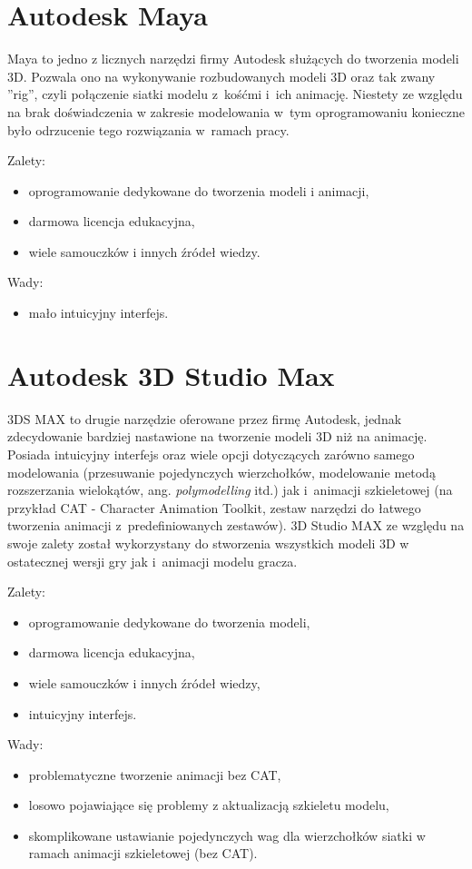 \section{Autodesk Maya}

Maya to jedno z licznych narzędzi firmy Autodesk służących do tworzenia modeli 3D. Pozwala ono na wykonywanie rozbudowanych modeli 3D oraz tak zwany ''rig'', czyli połączenie siatki modelu z~kośćmi i~ich animację. Niestety ze względu na brak doświadczenia w zakresie modelowania w~tym oprogramowaniu konieczne było odrzucenie tego rozwiązania w~ramach pracy.

{\raggedright Zalety:
\begin{itemize}
\item oprogramowanie dedykowane do tworzenia modeli i animacji,
\item darmowa licencja edukacyjna,
\item wiele samouczków i innych źródeł wiedzy.
\end{itemize}

Wady:
\begin{itemize}
\item mało intuicyjny interfejs.
\end{itemize}
}

\section{Autodesk 3D Studio Max}

3DS MAX to drugie narzędzie oferowane przez firmę Autodesk, jednak zdecydowanie bardziej nastawione na tworzenie modeli 3D niż na animację. Posiada intuicyjny interfejs oraz wiele opcji dotyczących zarówno samego modelowania (przesuwanie pojedynczych wierzchołków, modelowanie metodą rozszerzania wielokątów, ang. \emph{polymodelling} itd.) jak i~animacji szkieletowej (na przykład CAT - Character Animation Toolkit, zestaw narzędzi do łatwego tworzenia animacji z~predefiniowanych zestawów). 3D Studio MAX ze względu na swoje zalety został wykorzystany do stworzenia wszystkich modeli 3D w ostatecznej wersji gry jak i~animacji modelu gracza.

{\raggedright Zalety:
\begin{itemize}
\item oprogramowanie dedykowane do tworzenia modeli,
\item darmowa licencja edukacyjna,
\item wiele samouczków i innych źródeł wiedzy,
\item intuicyjny interfejs.
\end{itemize}

Wady:
\begin{itemize}
\item problematyczne tworzenie animacji bez CAT,
\item losowo pojawiające się problemy z aktualizacją szkieletu modelu,
\item skomplikowane ustawianie pojedynczych wag dla wierzchołków siatki w ramach animacji szkieletowej (bez CAT).
\end{itemize}
}

